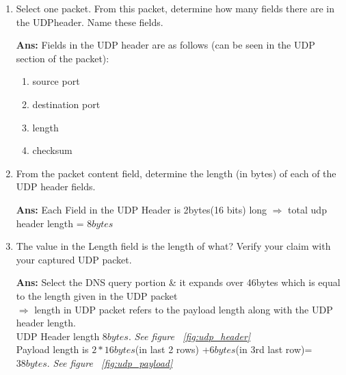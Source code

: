 \documentclass[a4,11pt]{article}
\newenvironment{que}
{ \color{ForestGreen}
  \begin{question}
}
{ \end{question} }
\newenvironment{sol}
{ \color{Black}
  \begin{solution}
}
{ \end{solution} }
\begin{document}
  \begin{enumerate}
   \item 
   \begin{que}
    Select one packet. From this packet, determine how many fields there are in the UDPheader. Name these fields.
   \end{que}

   \begin{sol}
   \textbf{Ans:} Fields in the UDP header are as follows (can be seen in the UDP section of the packet): 
   \begin{multicols}{2}
      \begin{enumerate}
	\item source port
	\item destination port
	\item length
	\item checksum
      \end{enumerate}
    \end{multicols} 
   \end{sol}

   
  \item
  \begin{que}
    From the packet content field, determine the length (in bytes) of each of the UDP header fields. 
  \end{que}

  \begin{sol}
   \textbf{Ans:}  Each Field in the UDP Header is 2bytes(16 bits) long $\Rightarrow$ total udp header length = $8bytes$
  \end{sol}
  
  
  \item
  \begin{que}
   The value in the Length field is the length of what? Verify your claim with your captured UDP packet.
  \end{que}

  \begin{sol}
  \textbf{Ans:} Select the DNS query portion \& it expands over 46bytes which is equal to the length given in the UDP packet \\
      $\Rightarrow$ length in UDP packet refers to the payload length along with the UDP header length. \\
         
      UDP Header length $8bytes$. \textit{See figure ~\ref{fig:udp_header} }\\
      Payload length is $2*16 bytes$(in last 2 rows) +$6 bytes$(in 3rd last row)= $38bytes$. \textit{See figure ~\ref{fig:udp_payload}}
   \end{sol} 


\end{enumerate}
\end{document}
